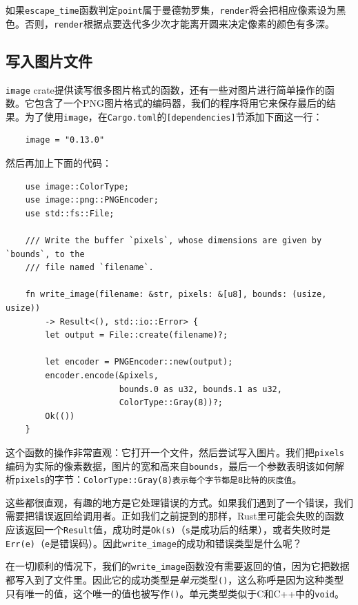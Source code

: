 如果\texttt{escape\_time}函数判定\texttt{point}属于曼德勃罗集，\texttt{render}将会把相应像素设为黑色。否则，\texttt{render}根据点要迭代多少次才能离开圆来决定像素的颜色有多深。

\subsection{写入图片文件}
\texttt{image} crate提供读写很多图片格式的函数，还有一些对图片进行简单操作的函数。它包含了一个PNG图片格式的编码器，我们的程序将用它来保存最后的结果。为了使用\texttt{image}，在\texttt{Cargo.toml}的\texttt{[dependencies]}节添加下面这一行：
\begin{verbatim}
    image = "0.13.0"
\end{verbatim}

然后再加上下面的代码：
\begin{verbatim}
    use image::ColorType;
    use image::png::PNGEncoder;
    use std::fs::File;

    /// Write the buffer `pixels`, whose dimensions are given by `bounds`, to the
    /// file named `filename`.

    fn write_image(filename: &str, pixels: &[u8], bounds: (usize, usize))
        -> Result<(), std::io::Error> {
        let output = File::create(filename)?;

        let encoder = PNGEncoder::new(output);
        encoder.encode(&pixels,
                       bounds.0 as u32, bounds.1 as u32,
                       ColorType::Gray(8))?;
        Ok(())
    }
\end{verbatim}

这个函数的操作非常直观：它打开一个文件，然后尝试写入图片。我们把\texttt{pixels}编码为实际的像素数据，图片的宽和高来自\texttt{bounds}，最后一个参数表明该如何解析\texttt{pixels}的字节：\texttt{ColorType::Gray(8)表示每个字节都是8比特的灰度值}。

这些都很直观，有趣的地方是它处理错误的方式。如果我们遇到了一个错误，我们需要把错误返回给调用者。正如我们之前提到的那样，Rust里可能会失败的函数应该返回一个\texttt{Result}值，成功时是\texttt{Ok(s)}（\texttt{s}是成功后的结果），或者失败时是\texttt{Err(e)}（\texttt{e}是错误码）。因此\texttt{write\_image}的成功和错误类型是什么呢？

在一切顺利的情况下，我们的\texttt{write\_image}函数没有需要返回的值，因为它把数据都写入到了文件里。因此它的成功类型是\emph{单元}类型\texttt{()}，这么称呼是因为这种类型只有唯一的值，这个唯一的值也被写作\texttt{()}。单元类型类似于C和C++中的\texttt{void}。

